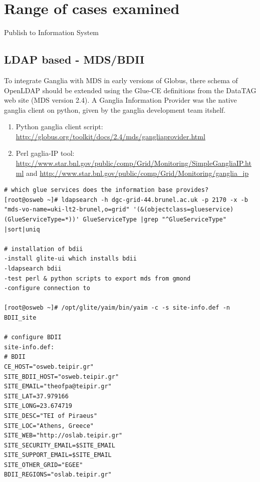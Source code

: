 \section{Range of cases examined}
Publish to Information System \cite{goelagent}

\subsection{LDAP based - MDS/BDII}
To integrate Ganglia with MDS in early versions of Globus, there schema of OpenLDAP should be extended using the Glue-CE definitions from the DataTAG web site (MDS version 2.4). A Ganglia Information Provider was the native ganglia client on python, given by the ganglia development team itshelf.
\begin{enumerate}
  \item Python ganglia client script: \url{http://globus.org/toolkit/docs/2.4/mds/gangliaprovider.html}
  \item Perl gaglia-IP tool: \url{http://www.star.bnl.gov/public/comp/Grid/Monitoring/SimpleGangliaIP.html} and \url{http://www.star.bnl.gov/public/comp/Grid/Monitoring/ganglia\_ip}
\end{enumerate}

\begin{verbatim}
# which glue services does the information base provides?
[root@osweb ~]# ldapsearch -h dgc-grid-44.brunel.ac.uk -p 2170 -x -b "mds-vo-name=uki-lt2-brunel,o=grid" '(&(objectclass=glueservice)(GlueServiceType=*))' GlueServiceType |grep "^GlueServiceType" |sort|uniq

# installation of bdii
-install glite-ui which installs bdii
-ldapsearch bdii
-test perl & python scripts to export mds from gmond
-configure connection to 

[root@osweb ~]# /opt/glite/yaim/bin/yaim -c -s site-info.def -n BDII_site

# configure BDII
site-info.def:
# BDII
CE_HOST="osweb.teipir.gr"
SITE_BDII_HOST="osweb.teipir.gr"
SITE_EMAIL="theofpa@teipir.gr"
SITE_LAT=37.979166
SITE_LONG=23.674719
SITE_DESC="TEI of Piraeus"
SITE_LOC="Athens, Greece"
SITE_WEB="http://oslab.teipir.gr"
SITE_SECURITY_EMAIL=$SITE_EMAIL
SITE_SUPPORT_EMAIL=$SITE_EMAIL
SITE_OTHER_GRID="EGEE"
BDII_REGIONS="oslab.teipir.gr"

\end{verbatim}

